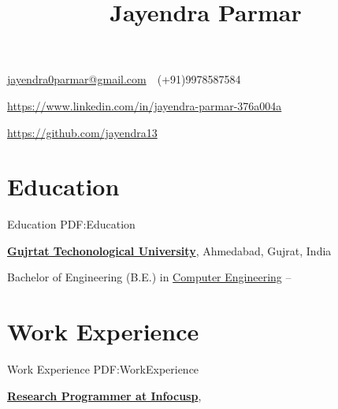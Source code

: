 \documentclass[letterpaper,MMMyyyy,nonstop]{simpleresumecv}
\newcommand{\CVAuthor}{Jayendra Parmar}
\begin{document}

\title{\CVAuthor}

\begin{subtitle}
\par
\href{mailto:jayendra0parmar@gmail.com}
{jayendra0parmar@gmail.com}
\,\SubBulletSymbol\,
(+91)9978587584
\,\SubBulletSymbol\,
\href{\CVWebpage}
{\CVWebpage}

\end{subtitle}

\begin{body}

    \href{https://www.linkedin.com/in/jayendra-parmar-376a004a}
    {https://www.linkedin.com/in/jayendra-parmar-376a004a}

    \href{https://github.com/jayendra13}
    {https://github.com/jayendra13}


\section
{Education}
{Education}
{PDF:Education}

\href{http://www.example.com/my-university}
{\textbf{Gujrtat Techonological University}},
Ahmedabad, Gujrat, India

\GapNoBreak
\BulletItem
Bachelor of Engineering (B.E.) in
\href{http://www.example.com/my-department}
{Computer Engineering}
\hfill
{} --


\section
{Work Experience}
{Work Experience}
{PDF:WorkExperience}


\href{http://www.infocusp.in}
{\textbf{Research Programmer at Infocusp}},


\end{body}
\end{document}
